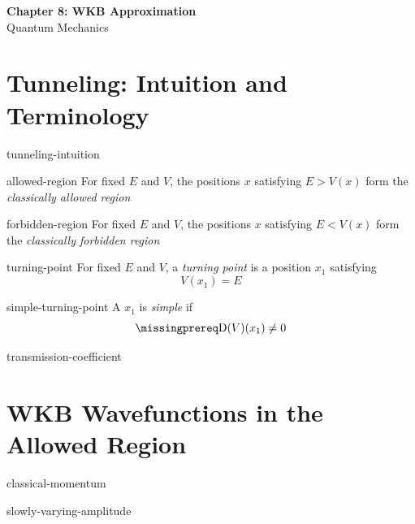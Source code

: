 \documentclass[12pt]{article}
\begin{document}
\begin{center}
  {\LARGE\bfseries Chapter 8: WKB Approximation}\\[0.25em]
  {\large Quantum Mechanics}\\[0.15em]
\end{center}

\section{Tunneling: Intuition and Terminology}

\begin{rem}{tunneling-intuition}
  \todo
\end{rem}

\begin{conv}{allowed-region}
  For fixed $E$ and $V$, the positions $x$ satisfying $E > V(x)$ form the \emph{classically allowed region}
\end{conv}

\begin{conv}{forbidden-region}
  For fixed $E$ and $V$, the positions $x$ satisfying $E < V(x)$ form the \emph{classically forbidden region}
\end{conv}

\begin{dfn}{turning-point}
  For fixed $E$ and $V$, a \emph{turning point} is a position $x_1$ satisfying
  \[
    V(x_1)=E
  \]
\end{dfn}

\begin{dfn}{simple-turning-point}
  A  $x_1$ is \emph{simple} if
  \[
    \DiffOp(V)(x_1)\ne0
  \]
\end{dfn}

\begin{dfn}{transmission-coefficient}
  \todo
\end{dfn}

\section{WKB Wavefunctions in the Allowed Region}

\begin{dfn}{classical-momentum}
  \todo
\end{dfn}

\begin{hypo}{slowly-varying-amplitude}
  \todo
\end{hypo}
\end{document}
